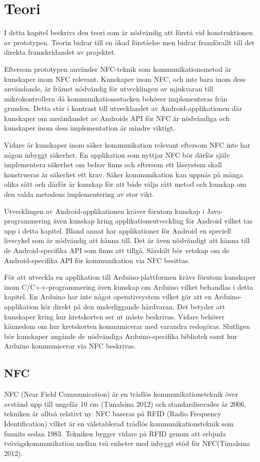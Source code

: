 \documentclass[11pt]{article}
\begin{document}
\section{Teori}
I detta kapitel beskrivs den teori som är nödvändig att förstå vid konstruktionen av prototypen. Teorin bidrar till en ökad förståelse men bidrar framförallt till det direkta framskridandet av projektet.  

Eftersom prototypen använder NFC-teknik som kommunikationsmetod är kunskaper inom NFC relevant. Kunskaper inom NFC, och inte bara inom dess användande, är främst nödvändig för utvecklingen av mjukvaran till mikrokontrollern då kommunikationsstacken behöver implementeras från grunden. Detta står i kontrast till utvecklandet av Android-applikationen där kunskaper om användandet av Androids API för NFC är nödvändiga och kunskaper inom dess implementation är mindre viktigt.

Vidare är kunskaper inom säker kommunikation relevant eftersom NFC inte har någon inbyggt säkerhet. En applikation som nyttjar NFC bör därför själv implementera säkerhet om behov finns och eftersom ett låssystem skall konstrueras är säkerhet ett krav. Säker kommunikation kan uppnås på många olika sätt och därför är kunskap för att både välja rätt metod och kunskap om den valda metodens implementering av stor vikt. 

Utvecklingen av Android-applikationen kräver förutom kunskap i Java-programmering även kunskap kring applikationsutveckling för Android vilket tas upp i detta kapitel. Bland annat har applikationer för Android en speciell livscykel som är nödvändig att känna till. Det är även nödvändigt att känna till de Android-specifika API som finns att tillgå. Särskilt bör vetskap om de Android-specifika API för kommunikation via NFC besittas. 

För att utveckla en applikation till Arduino-plattformen krävs förutom kunskaper inom C/C++-programmering även kunskap om Arduino vilket behandlas i detta kapitel. En Arduino har inte något operativsystem vilket gör att en Arduino-applikation kör direkt på den underliggande hårdvaran. Det betyder att kunskaper kring hur kretskorten ser ut måste beskrivas. Vidare behöver kännedom om hur kretskorten kommunicerar med varandra redogöras. Slutligen bör kunskaper angånde de nödvändiga Arduino-specifika bibliotek samt hur Arduino kommunicerar via NFC beskrivas.

\subsection{NFC}
NFC (Near Field Communication) är en trådlös kommunikationsteknik över avstånd upp till ungefär 10 cm (Timalsina 2012) och standardiserades år 2006, tekniken är alltså relativt ny. NFC baseras på RFID (Radio Frequency Identification) vilket är en väletablerad trådlös kommunikationsteknik som funnits sedan 1983.  Tekniken bygger vidare på RFID genom att erbjuda tvåvägskommunikation mellan två enheter med inbyggt stöd för NFC(Timalsina 2012). 
\end{document}
